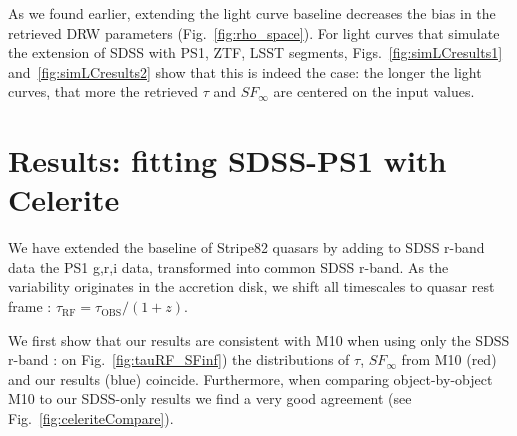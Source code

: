 \documentclass[twocolumn]{aastex62}
\begin{document}
As we found earlier, extending the light curve baseline decreases the bias in the retrieved DRW parameters (Fig.~\ref{fig:rho_space}). For light curves that simulate the extension of SDSS with PS1, ZTF, LSST segments, Figs.~\ref{fig:simLCresults1} and~\ref{fig:simLCresults2} show that this is indeed the case: the longer the light curves, that more the retrieved $\tau$ and $SF_{\infty}$ are centered on the input values. 

\begin{figure*}
\caption{Retrieved $\tau$ and $\sigma$  parameters for simulated LCs. }
\label{fig:simLCresults1}
\end{figure*} 

\begin{figure*}
\caption{Comparison of retrieved parameters in relation to input parameters, shown as Fig.18 in \citet{macleod2011} }
\label{fig:simLCresults2}
\end{figure*} 


%
%
%
%
%
%
%
%

\section{Results: fitting SDSS-PS1 with Celerite}\label{sec:results}

We have extended the baseline of Stripe82 quasars by adding to SDSS r-band data the  PS1 g,r,i data, transformed into common SDSS r-band. As the variability originates in the accretion disk, we shift all timescales to quasar rest frame : $\tau_{\mathrm{RF}} = \tau_{\mathrm{OBS}} / (1+z)$. 


\begin{figure*}
\caption{Comparing the rest-frame timescales $\tau$, and asymptotic variability amplitudes $SF_{\infty}$, for M10 SDSS r-band,  and combined SDSS and PS1 data.  }
\label{fig:tauRF_SFinf}
\end{figure*} 


We first show that our results are consistent with M10 when using only the SDSS r-band : on Fig.~\ref{fig:tauRF_SFinf}) the distributions of $\tau$, $SF_{\infty}$ from M10 (red) and our results (blue) coincide. Furthermore, when comparing object-by-object M10 to our SDSS-only results we find a very good agreement (see Fig.~\ref{fig:celeriteCompare}).


\begin{figure*}
\caption{Plot comparing results for SDSS r-band fitting of  M10 ($\sigma_{m}, \tau_{m}$), and current results for SDSS r-band using Celerite ($\sigma_{fit}, \tau_{fit}$). }
\label{fig:celeriteCompare}
\end{figure*} 
\end{document}
